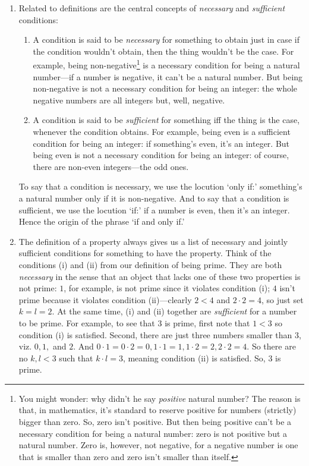 \begin{enumerate}[{\thesection}.1]
		\item Related to definitions are the central concepts of \emph{necessary} and \emph{sufficient} conditions:
		
			\begin{enumerate}[\thesection.{20}.a]
		
			\item  A condition is said to be \emph{necessary} for something to obtain just in case if the condition wouldn't obtain, then the thing wouldn't be the case. For example, being non-negative\footnote{You might wonder: why didn't he say \emph{positive} natural number? The reason is that, in mathematics, it's standard to reserve positive for numbers (strictly) bigger than zero. So, zero isn't positive. But then being positive can't be a necessary condition for being a natural number: zero is not positive but a natural number. Zero is, however, not negative, for a negative number is one that is smaller than zero and zero isn't smaller than itself.} is a necessary condition for being a natural number---if a number is negative, it can't be a natural number. But being non-negative is not a necessary condition for being an integer: the whole negative numbers are all integers but, well, negative.
						
			\item A condition is said to be \emph{sufficient} for something iff the thing is the case, whenever the condition obtains. For example, being even is a sufficient condition for being an integer: if something's even, it's an integer. But being even is not a necessary condition for being an integer: of course, there are non-even integers---the odd ones.		
			
			\end{enumerate}
		
	To say that a condition is necessary, we use the locution `only if:' something's a natural number only if it is non-negative. And to say that a condition is sufficient, we use the locution `if:' if a number is even, then it's an integer. Hence the origin of the phrase `if and only if.'
		
	\item The definition of a property always gives us a list of necessary and jointly sufficient conditions for something to have the property. Think of the conditions (i) and (ii) from our definition of being prime. They are both \emph{necessary} in the sense that an object that lacks one of these two properties is not prime: $1$, for example, is not prime since it violates condition (i); $4$ isn't prime because it violates condition (ii)---clearly $2<4$ and $2\cdot 2=4$, so just set $k=l=2$. At the same time, (i) and (ii) together are \emph{sufficient} for a number to be prime. For example, to see that $3$ is prime, first note that $1<3$ so condition (i) is satisfied. Second, there are just three numbers smaller than 3, viz. $0,1,$ and $2$. And $0\cdot 1=0\cdot 2= 0, 1\cdot 1=1, 1\cdot 2=2, 2\cdot 2=4$. So there are no $k,l<3$ such that $k\cdot l=3$, meaning condition (ii) is satisfied. So, $3$ is prime.
	

\end{enumerate}
